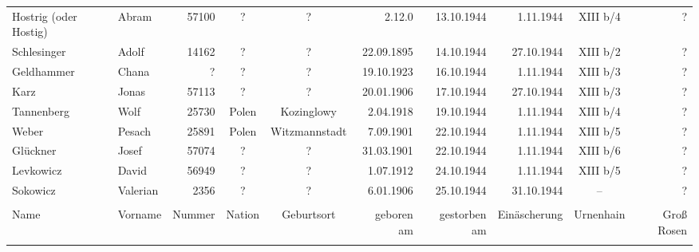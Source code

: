 \begin{tiny}
\begin{longtable}[l]{|l|l|r|c|c|r|r|r|c|r|}
Hostrig (oder Hostig)  &  Abram  & 57100 &  ?  &  ?  & 2.12.0 & 13.10.1944 & 1.11.1944 &  XIII b/4  &  ? \\[3pt] %
Schlesinger  &  Adolf  & 14162 &  ?  &  ?  & 22.09.1895 & 14.10.1944 & 27.10.1944 &  XIII b/2  &  ? \\[3pt]
Geldhammer  &  Chana  &  ?  &  ?  &  ?  & 19.10.1923 & 16.10.1944 & 1.11.1944 &  XIII b/3  &  ? \\[3pt]
Karz  &  Jonas  & 57113 &  ?  &  ?  & 20.01.1906 & 17.10.1944 & 27.10.1944 &  XIII b/3  &  ? \\[3pt]
Tannenberg  &  Wolf  & 25730 &  Polen  &  Kozinglowy  & 2.04.1918 & 19.10.1944 & 1.11.1944 &  XIII b/4  &  ? \\[3pt]
Weber  &  Pesach  & 25891 &  Polen  &  Witzmannstadt  & 7.09.1901 & 22.10.1944 & 1.11.1944 &  XIII b/5  &  ? \\[3pt]
Glückner  &  Josef  & 57074 &  ?  &  ?  & 31.03.1901 & 22.10.1944 & 1.11.1944 &  XIII b/6  &  ? \\[3pt]
Levkowicz  &  David  & 56949 &  ?  &  ?  & 1.07.1912 & 24.10.1944 & 1.11.1944 &  XIII b/5  &  ? \\[3pt]
Sokowicz  &  Valerian  & 2356 &  ?  &  ?  & 6.01.1906 & 25.10.1944 & 31.10.1944 &  --  &  ? \\[3pt]

\hline\pagebreak\hline  & \\[-9pt]
Name  &  Vorname  &  Nummer  &  Nation  &  Geburtsort  &  geboren am  &  gestorben am  &  Einäscherung  &  Urnenhain  &  Groß Rosen \\[3pt]
\hline  & \\[-9pt]


\end{longtable}
\end{tiny}
